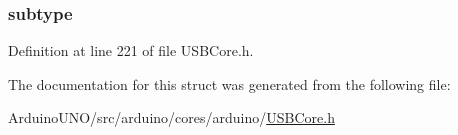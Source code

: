 \subsubsection[{subtype}]{ subtype}\label{struct_c_m_functional_descriptor_afb82dd1313bc5284e4e5aef8218ef414}


Definition at line 221 of file U\+S\+B\+Core.\+h.



The documentation for this struct was generated from the following file\+:\begin{DoxyCompactItemize}
\item 
Arduino\+U\+N\+O/src/arduino/cores/arduino/\hyperlink{_u_s_b_core_8h}{U\+S\+B\+Core.\+h}\end{DoxyCompactItemize}
